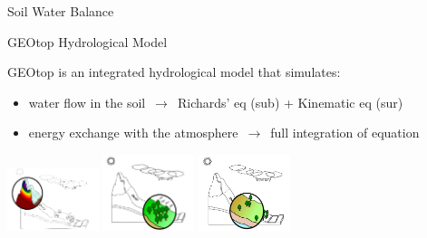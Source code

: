 \documentclass[ignorenonframetext,]{beamer}
\begin{document}
\begin{frame}{Soil Water Balance}
\protect\hypertarget{soil-water-balance}{}

\end{frame}

\begin{frame}{GEOtop Hydrological Model}
\protect\hypertarget{geotop-hydrological-model}{}

GEOtop is an integrated hydrological model that simulates:

\begin{itemize}
\item water flow in the soil $\,\to\,$ Richards' eq (sub) + Kinematic eq (sur)
\item energy exchange with the atmosphere $\,\to\,$ full integration of equation
\end{itemize}

\includegraphics[width=0.2\textwidth,height=\textheight]{resources/images/geotop_snow.png}
\includegraphics[width=0.2\textwidth,height=\textheight]{resources/images/geotop_vegetation.png}
\includegraphics[width=0.2\textwidth,height=\textheight]{resources/images/geotop_infiltration.png}

\end{frame}
\end{document}
